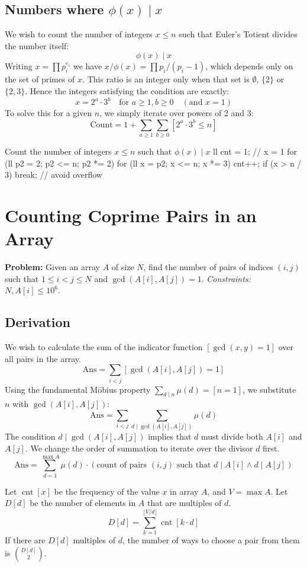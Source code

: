 \documentclass[11pt]{article}
\newcommand{\cnt}{\operatorname{cnt}}
\begin{document}
\subsection{Numbers where \texorpdfstring{$\phi(x) \mid x$}{phi(x) | x}}
We wish to count the number of integers $x \le n$ such that Euler's Totient divides the number itself:
\[ \phi(x) \mid x \]
Writing $x = \prod p_i^{e_i}$ we have $x/\phi(x) = \prod p_i/(p_i-1)$, which depends only on the set of primes of $x$. This ratio is an integer only when that set is $\emptyset$, $\{2\}$ or $\{2,3\}$. Hence the integers satisfying the condition are exactly:
\[ x = 2^a \cdot 3^b \quad \text{for } a \ge 1, b \ge 0 \quad (\text{and } x=1) \]
To solve this for a given $n$, we simply iterate over powers of 2 and 3:
\[ \text{Count} = 1 + \sum_{a \ge 1} \sum_{b \ge 0} [2^a \cdot 3^b \le n] \]

\begin{vscode}{Count the number of integers $x \le n$ such that $\phi(x) \mid x$}
ll cnt = 1; // x = 1
for (ll p2 = 2; p2 <= n; p2 *= 2)
{
    for (ll x = p2; x <= n; x *= 3)
    {
        cnt++;
        if (x > n / 3)
            break; // avoid overflow
    }
}
\end{vscode}

\pagebreak
\section{Counting Coprime Pairs in an Array}
\label{sec:coprime_harmonic}

\textbf{Problem:} Given an array $A$ of size $N$, find the number of pairs of indices $(i, j)$ such that $1 \le i < j \le N$ and $\gcd(A[i], A[j]) = 1$.
\textit{Constraints:} $N, A[i] \le 10^6$.

\subsection{Derivation}

\begin{derivation}
    We wish to calculate the sum of the indicator function $[\gcd(x, y) = 1]$ over all pairs in the array.
    \[ \text{Ans} = \sum_{i < j} [\gcd(A[i], A[j]) = 1] \]
    Using the fundamental Möbius property $\sum_{d \mid n} \mu(d) = [n=1]$, we substitute $n$ with $\gcd(A[i], A[j])$:
    \[ \text{Ans} = \sum_{i < j} \sum_{d \mid \gcd(A[i], A[j])} \mu(d) \]
    The condition $d \mid \gcd(A[i], A[j])$ implies that $d$ must divide both $A[i]$ and $A[j]$. We change the order of summation to iterate over the divisor $d$ first.
    \[ \text{Ans} = \sum_{d=1}^{\max A} \mu(d) \cdot (\text{count of pairs } (i, j) \text{ such that } d \mid A[i] \land d \mid A[j]) \]

    Let $\cnt[x]$ be the frequency of the value $x$ in array $A$, and $V = \max A$.
    Let $D[d]$ be the number of elements in $A$ that are multiples of $d$.
    \[ D[d] = \sum_{k=1}^{\lfloor V/d \rfloor} \cnt[k \cdot d] \]
    If there are $D[d]$ multiples of $d$, the number of ways to choose a pair from them is $\binom{D[d]}{2}$.
\end{derivation}
\end{document}
